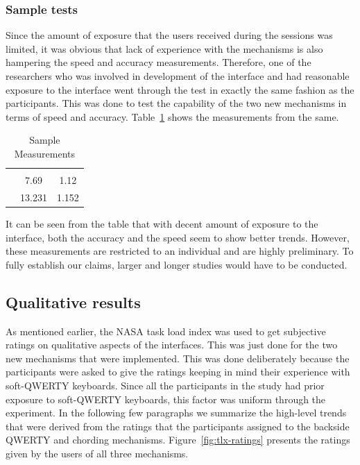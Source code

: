 \subsubsection{Sample tests}

Since the amount of exposure that the users received during the
sessions was limited, it was obvious that lack of experience with the
mechanisms is also hampering the speed and accuracy
measurements. Therefore, one of the researchers who was involved in
development of the interface and had reasonable exposure to the
interface went through the test in exactly the same fashion as the
participants. This was done to test the capability of the two new
mechanisms in terms of speed and
accuracy. Table~\ref{tab:StatisticsForTestCorpora} shows the
measurements from the same.

\begin{table}
	\centering
		\begin{tabular}{rcc} 
		                         & \color{grey}{WPM}    & \color{grey}{KSPC} \\ 
                   \color{grey}{Chording} & 7.69   & 1.12 \\ 
                   \color{grey}{Backside QWERTY} & 13.231 & 1.152 \\ 
		\end{tabular}
	\caption{Sample Measurements}
	\label{tab:StatisticsForTestCorpora}
\end{table}

It can be seen from the table that with decent amount of exposure to
the interface, both the accuracy and the speed seem to show better
trends. However, these measurements are restricted to an individual
and are highly preliminary. To fully establish our claims, larger and
longer studies would have to be conducted.

\subsection{Qualitative results}

As mentioned earlier, the NASA task load index was used to get
subjective ratings on qualitative aspects of the interfaces. This was
just done for the two new mechanisms that were implemented. This was
done deliberately because the participants were asked to give the
ratings keeping in mind their experience with soft-QWERTY
keyboards. Since all the participants in the study had prior exposure
to soft-QWERTY keyboards, this factor was uniform through the
experiment. In the following few paragraphs we summarize the
high-level trends that were derived from the ratings that the
participants assigned to the backside QWERTY and chording
mechanisms. Figure~\ref{fig:tlx-ratings} presents the ratings given by
the users of all three mechanisms.

